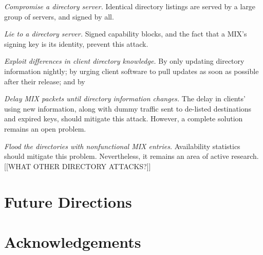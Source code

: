 \documentclass{llncs}
\begin{document}
\begin{description}
\item \emph{Compromise a directory server.} Identical directory listings
  are served by a large group of servers, and signed by all.
\item \emph{Lie to a directory server.}  Signed capability blocks, and
  the fact that a MIX's signing key is its identity, prevent this
  attack.
\item \emph{Exploit differences in client directory knowledge.}  By
  only updating directory information nightly; by urging client
  software to pull updates as soon as possible after their release;
  and by 
\item \emph{Delay MIX packets until directory information changes.}
  The delay in clients' using new information, along with dummy
  traffic sent to de-listed destinations and expired keys, should
  mitigate this attack. However, a complete solution remains an
  open problem.
\item \emph{Flood the directories with nonfunctional MIX entries.}
  Availability statistics should mitigate this problem.  Nevertheless,
  it remains an area of active research. \cite{mix-acc, casc-rep}
[[WHAT OTHER DIRECTORY ATTACKS?]]
\end{description}


\section{Future Directions}
\label{sec:conclusion}


\section*{Acknowledgements}


 
\end{document}
